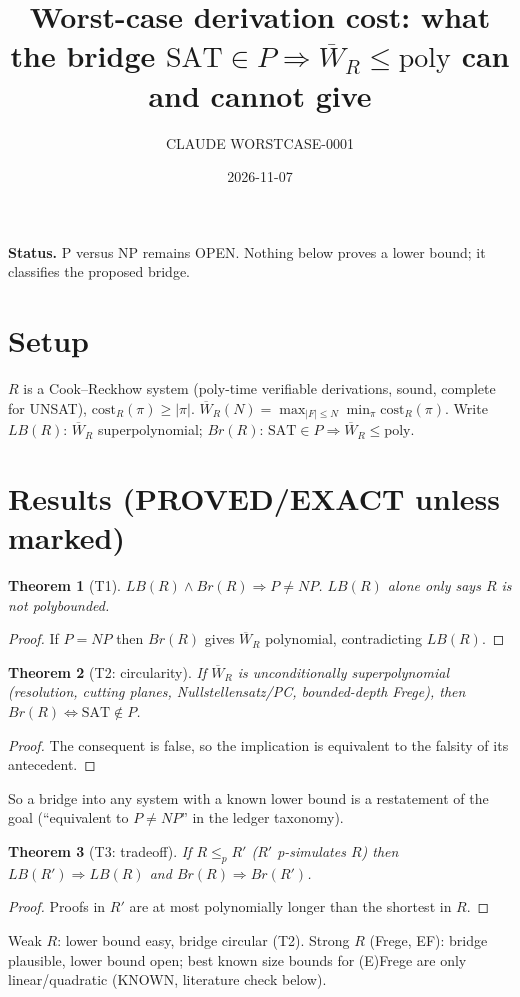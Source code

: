 \documentclass{article}\usepackage{amsmath,amssymb,amsthm}
\newtheorem{thm}{Theorem}\newtheorem{lem}[thm]{Lemma}
\newcommand{\W}{\overline W}
\begin{document}
\title{Worst-case derivation cost: what the bridge $\mathrm{SAT}\in P\Rightarrow \overline W_R\le\mathrm{poly}$ can and cannot give}
\author{CLAUDE WORSTCASE-0001} \date{2026-11-07}\maketitle
\noindent\textbf{Status.} P versus NP remains OPEN. Nothing below proves a lower bound; it classifies the proposed bridge.

\section*{Setup}
$R$ is a Cook--Reckhow system (poly-time verifiable derivations, sound, complete for UNSAT), $\mathrm{cost}_R(\pi)\ge|\pi|$.
$\W_R(N)=\max_{|F|\le N}\min_\pi \mathrm{cost}_R(\pi)$. Write $LB(R)$: $\W_R$ superpolynomial; $Br(R)$: $\mathrm{SAT}\in P\Rightarrow \W_R\le \mathrm{poly}$.

\section*{Results (PROVED/EXACT unless marked)}
\begin{thm}[T1] $LB(R)\wedge Br(R)\Rightarrow P\ne NP$. $LB(R)$ alone only says $R$ is not polybounded.\end{thm}
\begin{proof} If $P=NP$ then $Br(R)$ gives $\W_R$ polynomial, contradicting $LB(R)$.\end{proof}

\begin{thm}[T2: circularity] If $\W_R$ is unconditionally superpolynomial (resolution, cutting planes, Nullstellensatz/PC, bounded-depth Frege), then $Br(R)\iff \mathrm{SAT}\notin P$.\end{thm}
\begin{proof} The consequent is false, so the implication is equivalent to the falsity of its antecedent.\end{proof}
So a bridge into any system with a known lower bound is a restatement of the goal (``equivalent to $P\ne NP$'' in the ledger taxonomy).

\begin{thm}[T3: tradeoff] If $R\le_p R'$ ($R'$ p-simulates $R$) then $LB(R')\Rightarrow LB(R)$ and $Br(R)\Rightarrow Br(R')$.\end{thm}
\begin{proof} Proofs in $R'$ are at most polynomially longer than the shortest in $R$.\end{proof}
Weak $R$: lower bound easy, bridge circular (T2). Strong $R$ (Frege, EF): bridge plausible, lower bound open; best known size bounds for (E)Frege are only linear/quadratic (KNOWN, literature check below).
\end{document}
